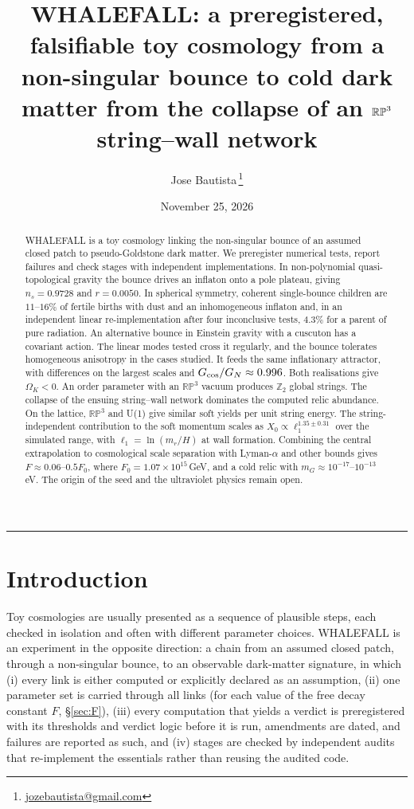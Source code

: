 \documentclass[11pt,a4paper]{article}
\title{\textbf{WHALEFALL: a preregistered, falsifiable toy cosmology from a non-singular bounce to cold dark matter from the collapse of an $\RP$ string--wall network}}
\author{Jose Bautista\,\orcidlink{0009-0001-6655-4028}\thanks{\href{mailto:jozebautista@gmail.com}{jozebautista@gmail.com}}}
\date{November 25, 2026}
\newcommand{\RP}{\mathbb{RP}^3}
\newcommand{\Ztwo}{\mathbb{Z}_2}
\begin{document}
\maketitle

\begin{abstract}
WHALEFALL is a toy cosmology linking the non-singular bounce of an assumed closed patch to pseudo-Goldstone dark matter. We preregister numerical tests, report failures and check stages with independent implementations.
In non-polynomial quasi-topological gravity the bounce drives an inflaton onto a pole plateau, giving $n_s=0.9728$ and $r=0.0050$. In spherical symmetry, coherent single-bounce children are $11$--$16\%$ of fertile births with dust and an inhomogeneous inflaton and, in an independent linear re-implementation after four inconclusive tests, $4.3\%$ for a parent of pure radiation.
An alternative bounce in Einstein gravity with a cuscuton has a covariant action. The linear modes tested cross it regularly, and the bounce tolerates homogeneous anisotropy in the cases studied. It feeds the same inflationary attractor, with differences on the largest scales and $G_{\rm cos}/G_N\approx0.996$. Both realisations give $\Omega_K<0$.
An order parameter with an $\RP$ vacuum produces $\Ztwo$ global strings. The collapse of the ensuing string--wall network dominates the computed relic abundance. On the lattice, $\RP$ and U(1) give similar soft yields per unit string energy. The string-independent contribution to the soft momentum scales as $X_0\propto\ell_1^{1.35\pm0.31}$ over the simulated range, with $\ell_1=\ln(m_r/H)$ at wall formation.
Combining the central extrapolation to cosmological scale separation with Lyman-$\alpha$ and other bounds gives $F\approx0.06$--$0.5F_0$, where $F_0=1.07\times10^{15}$\,GeV, and a cold relic with $m_G\approx10^{-17}$--$10^{-13}$\,eV. The origin of the seed and the ultraviolet physics remain open.
\end{abstract}

\clearpage
\tableofcontents
\bigskip\hrule\bigskip

\section{Introduction}

Toy cosmologies are usually presented as a sequence of plausible steps, each checked in isolation and often with different parameter choices.
WHALEFALL is an experiment in the opposite direction: a chain from an assumed closed patch, through a non-singular bounce, to an observable dark-matter signature, in which
(i) every link is either computed or explicitly declared as an assumption,
(ii) one parameter set is carried through all links (for each value of the free decay constant $F$, \S\ref{sec:F}),
(iii) every computation that yields a verdict is preregistered with its thresholds and verdict logic before it is run, amendments are dated, and failures are reported as such, and
(iv) stages are checked by independent audits that re-implement the essentials rather than reusing the audited code.
\end{document}
